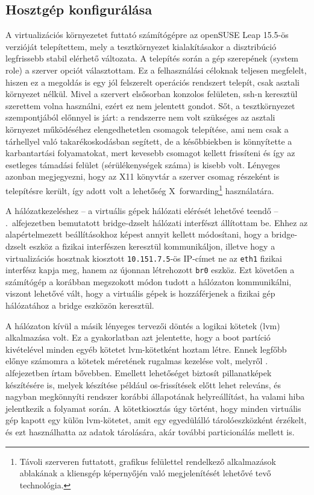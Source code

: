 \subsection{Hosztgép konfigurálása}
A virtualizációs környezetet futtató számítógépre az openSUSE Leap 15.5-ös verzióját telepítettem, mely a tesztkörnyezet kialakításakor a disztribúció legfrissebb stabil elérhető változata. A telepítés során a gép szerepének (system role) a szerver opciót választottam. Ez a felhasználási céloknak teljesen megfelelt, hiszen ez a megoldás is egy jól felszerelt operációs rendszert telepít, csak asztali környezet nélkül. Mivel a szervert elsősorban konzolos felületen, \acrshort{ssh}-n keresztül szerettem volna használni, ezért ez nem jelentett gondot. Sőt, a tesztkörnyezet szempontjából előnnyel is járt: a rendszerre nem volt szükséges az asztali környezet működéséhez elengedhetetlen csomagok telepítése, ami nem csak a tárhellyel való takarékoskodásban segített, de a későbbiekben is könnyítette a karbantartási folyamatokat, mert kevesebb csomagot kellett frissíteni és így az esetleges támadási felület (sérülékenységek száma) is kisebb volt. Lényeges azonban megjegyezni, hogy az X11 könyvtár a szerver csomag részeként is telepítésre került, így adott volt a lehetőség X~forwarding\footnote{Távoli szerveren futtatott, grafikus felülettel rendelkező alkalmazások ablakának a kliensgép képernyőjén való megjelenítését lehetővé tevő technológia.} használatára.

A hálózatkezeléshez -- a virtuális gépek hálózati elérését lehetővé teendő -- .~alfejezetben bemutatott bridge-dzselt hálózati interfészt állítottam be. Ehhez az alapértelmezett beállításokhoz képest annyit kellett módosítani, hogy a bridge-dzselt eszköz a fizikai interfészen keresztül kommunikáljon, illetve hogy a virtualizációs hosztnak kiosztott \texttt{10.151.7.5}-ös IP-címet ne az \texttt{eth1} fizikai interfész kapja meg, hanem az újonnan létrehozott \texttt{br0} eszköz. Ezt követően a számítógép a korábban megszokott módon tudott a hálózaton kommunikálni, viszont lehetővé vált, hogy a virtuális gépek is hozzáférjenek a fizikai gép hálózatához a bridge eszközön keresztül.

A hálózaton kívül a másik lényeges tervezői döntés a logikai kötetek (\acrshort{lvm}) alkalmazása volt. Ez a gyakorlatban azt jelentette, hogy a boot partíció kivételével minden egyéb kötetet \acrshort{lvm}-kötetként hoztam létre. Ennek legfőbb előnye számomra a kötetek méretének rugalmas kezelése volt, melyről . alfejezetben írtam bővebben. Emellett lehetőséget biztosít pillanatképek készítésére is, melyek készítése például \acrshort{os}-frissítések előtt lehet releváns, és nagyban megkönnyíti rendszer korábbi állapotának helyreállítást, ha valami hiba jelentkezik a folyamat során. A kötetkiosztás úgy történt, hogy minden virtuális gép kapott egy külön \acrshort{lvm}-kötetet, amit egy egyedülálló tárolóeszközként érzékelt, és ezt használhatta az adatok tárolására, akár további particionálás mellett is.

